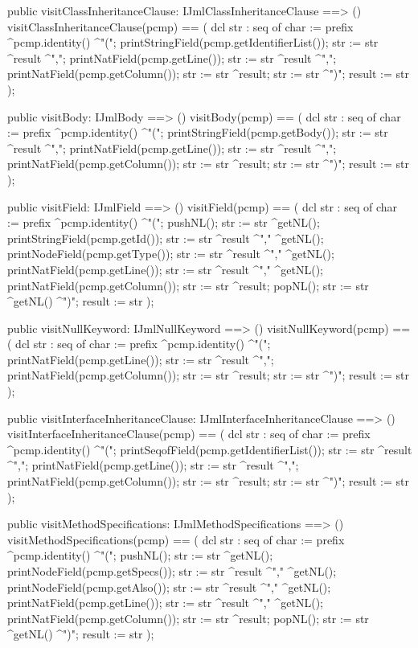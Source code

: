\begin{vdm_al}
  public visitClassInheritanceClause: IJmlClassInheritanceClause ==> ()
  visitClassInheritanceClause(pcmp) ==
    ( dcl str : seq of char := prefix ^pcmp.identity() ^"(";
      printStringField(pcmp.getIdentifierList());
      str := str ^result ^",";
      printNatField(pcmp.getLine());
      str := str ^result ^",";
      printNatField(pcmp.getColumn());
      str := str ^result;
      str := str ^")";
      result := str );

  public visitBody: IJmlBody ==> ()
  visitBody(pcmp) ==
    ( dcl str : seq of char := prefix ^pcmp.identity() ^"(";
      printStringField(pcmp.getBody());
      str := str ^result ^",";
      printNatField(pcmp.getLine());
      str := str ^result ^",";
      printNatField(pcmp.getColumn());
      str := str ^result;
      str := str ^")";
      result := str );

  public visitField: IJmlField ==> ()
  visitField(pcmp) ==
    ( dcl str : seq of char := prefix ^pcmp.identity() ^"(";
      pushNL();
      str := str ^getNL();
      printStringField(pcmp.getId());
      str := str ^result ^"," ^getNL();
      printNodeField(pcmp.getType());
      str := str ^result ^"," ^getNL();
      printNatField(pcmp.getLine());
      str := str ^result ^"," ^getNL();
      printNatField(pcmp.getColumn());
      str := str ^result;
      popNL();
      str := str ^getNL() ^")";
      result := str );

  public visitNullKeyword: IJmlNullKeyword ==> ()
  visitNullKeyword(pcmp) ==
    ( dcl str : seq of char := prefix ^pcmp.identity() ^"(";
      printNatField(pcmp.getLine());
      str := str ^result ^",";
      printNatField(pcmp.getColumn());
      str := str ^result;
      str := str ^")";
      result := str );

  public visitInterfaceInheritanceClause: IJmlInterfaceInheritanceClause ==> ()
  visitInterfaceInheritanceClause(pcmp) ==
    ( dcl str : seq of char := prefix ^pcmp.identity() ^"(";
      printSeqofField(pcmp.getIdentifierList());
      str := str ^result ^",";
      printNatField(pcmp.getLine());
      str := str ^result ^",";
      printNatField(pcmp.getColumn());
      str := str ^result;
      str := str ^")";
      result := str );

  public visitMethodSpecifications: IJmlMethodSpecifications ==> ()
  visitMethodSpecifications(pcmp) ==
    ( dcl str : seq of char := prefix ^pcmp.identity() ^"(";
      pushNL();
      str := str ^getNL();
      printNodeField(pcmp.getSpecs());
      str := str ^result ^"," ^getNL();
      printNodeField(pcmp.getAlso());
      str := str ^result ^"," ^getNL();
      printNatField(pcmp.getLine());
      str := str ^result ^"," ^getNL();
      printNatField(pcmp.getColumn());
      str := str ^result;
      popNL();
      str := str ^getNL() ^")";
      result := str );


\end{vdm_al}
